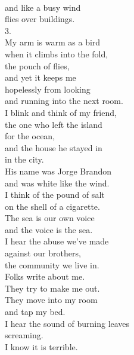 \documentclass[smalldemyvopaper,11pt,twoside,onecolumn,openright,extrafontsizes]{memoir}
\begin{document}
\\and like a busy wind
\\flies over buildings.
\\3.
\\My arm is warm as a bird
\\when it climbs into the fold,
\\the pouch of flies,
\\and yet it keeps me
\\hopelessly from looking
\\and running into the next room.
\\I blink and think of my friend,
\\the one who left the island
\\for the ocean,
\\and the house he stayed in
\\in the city.
\\His name was Jorge Brandon
\\and was white like the wind.
\\I think of the pound of salt
\\on the shell of a cigarette.
\\The sea is our own voice
\\and the voice is the sea.
\\I hear the abuse we've made
\\against our brothers,
\\the community we live in.
\\Folks write about me.
\\They try to make me out.
\\They move into my room
\\and tap my bed.
\\I hear the sound of burning leaves
\\screaming.
\\I know it is terrible.
\end{document}
